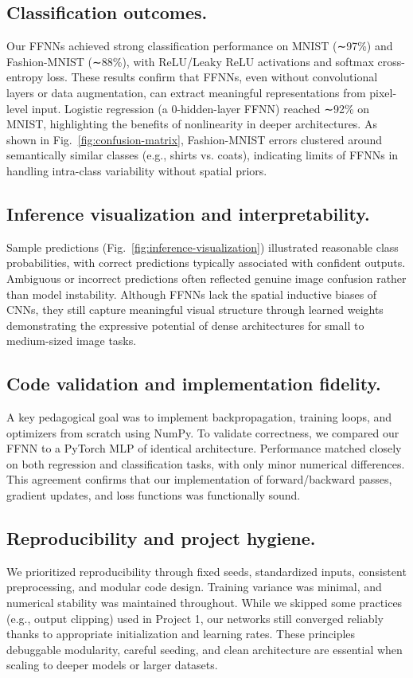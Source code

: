 \documentclass[amssymb,twocolumn,aps]{revtex4}
\begin{document}
\subsection{Classification outcomes.}  
Our FFNNs achieved strong classification performance on MNIST (∼97\%) and Fashion-MNIST (∼88\%), with ReLU/Leaky ReLU activations and softmax cross-entropy loss. These results confirm that FFNNs, even without convolutional layers or data augmentation, can extract meaningful representations from pixel-level input. Logistic regression (a 0-hidden-layer FFNN) reached ∼92\% on MNIST, highlighting the benefits of nonlinearity in deeper architectures. As shown in Fig.~\ref{fig:confusion-matrix}, Fashion-MNIST errors clustered around semantically similar classes (e.g., shirts vs. coats), indicating limits of FFNNs in handling intra-class variability without spatial priors.

\subsection{Inference visualization and interpretability.}  
Sample predictions (Fig.~\ref{fig:inference-visualization}) illustrated reasonable class probabilities, with correct predictions typically associated with confident outputs. Ambiguous or incorrect predictions often reflected genuine image confusion rather than model instability. Although FFNNs lack the spatial inductive biases of CNNs, they still capture meaningful visual structure through learned weights demonstrating the expressive potential of dense architectures for small to medium-sized image tasks.

\subsection{Code validation and implementation fidelity.}  
A key pedagogical goal was to implement backpropagation, training loops, and optimizers from scratch using NumPy. To validate correctness, we compared our FFNN to a PyTorch MLP of identical architecture. Performance matched closely on both regression and classification tasks, with only minor numerical differences. This agreement confirms that our implementation of forward/backward passes, gradient updates, and loss functions was functionally sound.

\subsection{Reproducibility and project hygiene.}  
We prioritized reproducibility through fixed seeds, standardized inputs, consistent preprocessing, and modular code design. Training variance was minimal, and numerical stability was maintained throughout. While we skipped some practices (e.g., output clipping) used in Project 1, our networks still converged reliably thanks to appropriate initialization and learning rates. These principles debuggable modularity, careful seeding, and clean architecture are essential when scaling to deeper models or larger datasets.
\end{document}
